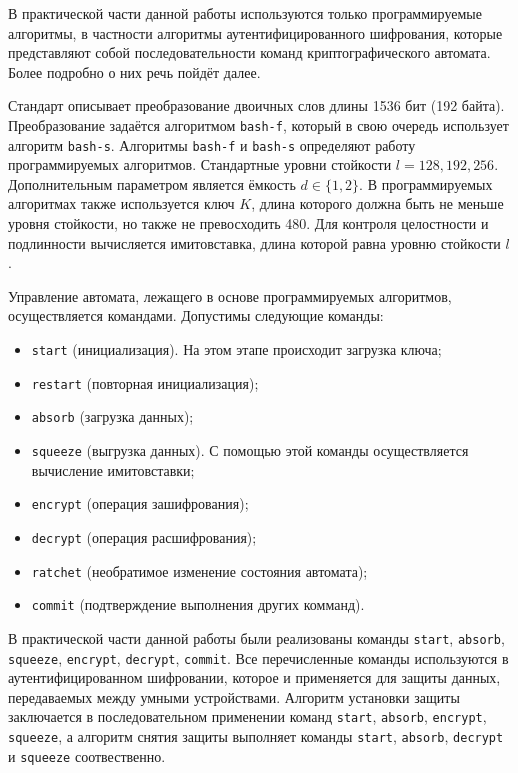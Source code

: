 	В практической части данной работы используются только программируемые алгоритмы, в частности
	алгоритмы аутентифицированного шифрования, которые представляют собой последовательности 
	команд криптографического автомата. Более подробно о них речь пойдёт далее.

	Стандарт описывает преобразование двоичных слов длины 1536 бит (192 байта). Преобразование
	задаётся алгоритмом \texttt{bash-f}, который в свою очередь использует алгоритм \texttt{bash-s}. 
	Алгоритмы \texttt{bash-f} и \texttt{bash-s} определяют работу программируемых алгоритмов. Стандартные уровни
	стойкости $l = 128, 192, 256$. Дополнительным параметром является ёмкость $d \in \{1, 2\}$.
	В программируемых алгоритмах также используется ключ $K$, длина которого должна быть не меньше 
	уровня стойкости, но также не превосходить 480. Для контроля целостности и подлинности вычисляется
	имитовставка, длина которой равна уровню стойкости $l$.
	
	Управление автомата, лежащего в основе программируемых алгоритмов, осуществляется командами.
	Допустимы следующие команды:
	
	\begin{itemize}
		\item \texttt{start} (инициализация). На этом этапе происходит загрузка ключа;
		\item \texttt{restart} (повторная инициализация);
		\item \texttt{absorb} (загрузка данных);
		\item \texttt{squeeze} (выгрузка данных). С помощью этой команды осуществляется вычисление имитовставки;
		\item \texttt{encrypt} (операция зашифрования);
		\item \texttt{decrypt} (операция расшифрования);
		\item \texttt{ratchet} (необратимое изменение состояния автомата);
		\item \texttt{commit} (подтверждение выполнения других комманд).
	\end{itemize}

	В практической части данной работы были реализованы команды \texttt{start}, \texttt{absorb}, \texttt{squeeze}, \texttt{encrypt}, 
	\texttt{decrypt}, \texttt{commit}. Все перечисленные команды используются в аутентифицированном шифровании,
	которое и применяется для защиты данных, передаваемых между умными устройствами. Алгоритм
	установки защиты заключается в последовательном применении команд \texttt{start}, \texttt{absorb}, \texttt{encrypt}, \texttt{squeeze},
	а алгоритм снятия защиты выполняет команды \texttt{start}, \texttt{absorb}, \texttt{decrypt} и \texttt{squeeze} соотвественно.
	
